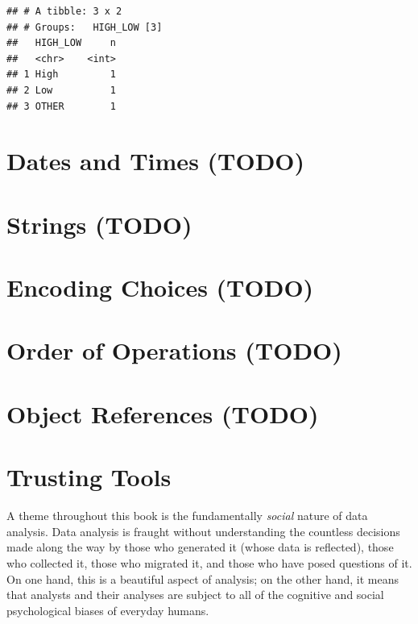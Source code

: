 \documentclass[
]{krantz}
\begin{document}
\begin{verbatim}
## # A tibble: 3 x 2
## # Groups:   HIGH_LOW [3]
##   HIGH_LOW     n
##   <chr>    <int>
## 1 High         1
## 2 Low          1
## 3 OTHER        1
\end{verbatim}

\hypertarget{dates-and-times-todo}{%
\section{Dates and Times (TODO)}\label{dates-and-times-todo}}

\hypertarget{strings-todo}{%
\section{Strings (TODO)}\label{strings-todo}}

\hypertarget{encoding-choices-todo}{%
\section{Encoding Choices (TODO)}\label{encoding-choices-todo}}

\hypertarget{order-of-operations-todo}{%
\section{Order of Operations (TODO)}\label{order-of-operations-todo}}

\hypertarget{object-references-todo}{%
\section{Object References (TODO)}\label{object-references-todo}}

\hypertarget{trusting-tools}{%
\section{Trusting Tools}\label{trusting-tools}}

A theme throughout this book is the fundamentally \emph{social} nature of data analysis. Data analysis is fraught without understanding the countless decisions made along the way by those who generated it (whose data is reflected), those who collected it, those who migrated it, and those who have posed questions of it. On one hand, this is a beautiful aspect of analysis; on the other hand, it means that analysts and their analyses are subject to all of the cognitive and social psychological biases of everyday humans.
\end{document}
